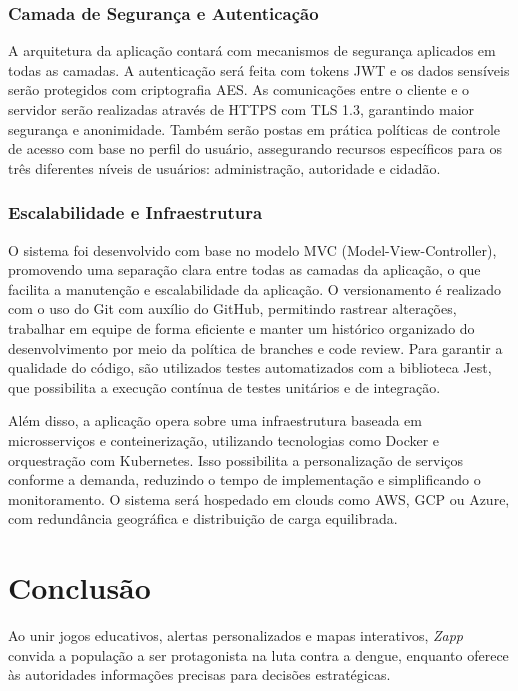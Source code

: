 \documentclass[a4paper, 12pt]{article}
\begin{document}
\subsubsection{Camada de Segurança e Autenticação}

A arquitetura da aplicação contará com mecanismos de segurança aplicados em todas as camadas. A autenticação será feita com tokens JWT e os dados sensíveis serão protegidos com criptografia AES. As comunicações entre o cliente e o servidor serão realizadas através de HTTPS com TLS 1.3, garantindo maior segurança e anonimidade. Também serão postas em prática políticas de controle de acesso com base no perfil do usuário, assegurando recursos específicos para os três diferentes níveis de usuários: administração, autoridade e cidadão.

\subsubsection{Escalabilidade e Infraestrutura}

O sistema foi desenvolvido com base no modelo MVC (Model-View-Controller), promovendo uma separação clara entre todas as camadas da aplicação, o que facilita a manutenção e escalabilidade da aplicação. O versionamento é realizado com o uso do Git com auxílio do GitHub, permitindo rastrear alterações, trabalhar em equipe de forma eficiente e manter um histórico organizado do desenvolvimento por meio da política de branches e code review. Para garantir a qualidade do código, são utilizados testes automatizados com a biblioteca Jest, que possibilita a execução contínua de testes unitários e de integração. 
\par Além disso, a aplicação opera sobre uma infraestrutura baseada em microsserviços e conteinerização, utilizando tecnologias como Docker e orquestração com Kubernetes. Isso possibilita a personalização de serviços conforme a demanda, reduzindo o tempo de implementação e simplificando o monitoramento. O sistema será hospedado em clouds como AWS, GCP ou Azure, com redundância geográfica e distribuição de carga equilibrada.

\newpage
\section{Conclusão}
Ao unir jogos educativos, alertas personalizados e mapas interativos, \textit{Zapp} convida a população a ser protagonista na luta contra a dengue, enquanto oferece às autoridades informações precisas para decisões estratégicas.
\end{document}

